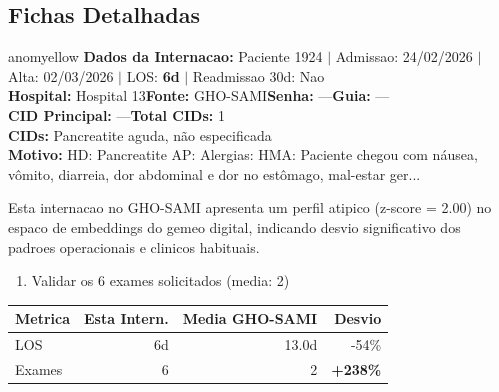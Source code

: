 \documentclass[a4paper,10pt]{article}
\begin{document}
\subsection{Fichas Detalhadas}
\begin{anomalycard}[Internacao 2075 | GHO-SAMI | MODERADO (z=2.00)]{anomyellow}
\textbf{Dados da Internacao:} Paciente 1924 $\mid$ Admissao: 24/02/2026 $\mid$ Alta: 02/03/2026 $\mid$ LOS: \textbf{6d} $\mid$ Readmissao 30d: Nao\\
\textbf{Hospital:} Hospital 13\quad\textbf{Fonte:} GHO-SAMI\quad\textbf{Senha:} ---\quad\textbf{Guia:} ---\\
\textbf{CID Principal:} {\small ---}\quad\textbf{Total CIDs:} 1\\

\textbf{CIDs:} {\scriptsize Pancreatite aguda, não especificada}\\

\textbf{Motivo:} {\scriptsize HD: Pancreatite AP: Alergias: HMA: Paciente chegou com náusea, vômito, diarreia, dor abdominal e dor no estômago, mal-estar ger...}\\

\vspace{2pt}\begin{tcolorbox}[colback=severityred!20,colframe=anomyellow,title={\textbf{Interpretacao de Negocio}},fonttitle=\bfseries\small,left=4pt,right=4pt,top=3pt,bottom=3pt]
{\small Esta internacao no GHO-SAMI apresenta um perfil atipico (z-score = 2.00) no espaco de embeddings do gemeo digital, indicando desvio significativo dos padroes operacionais e clinicos habituais.}
\end{tcolorbox}
\begin{tcolorbox}[colback=severityyellow!30,colframe=anomorange,title={\textbf{Recomendacoes Especificas}},fonttitle=\bfseries\small,left=4pt,right=4pt,top=3pt,bottom=3pt]
\begin{enumerate}[nosep,leftmargin=16pt]
\item {\small Validar os 6 exames solicitados (media: 2)}
\end{enumerate}
\end{tcolorbox}
\begin{center}\begin{tabular}{l r r r}\toprule\textbf{Metrica} & \textbf{Esta Intern.} & \textbf{Media GHO-SAMI} & \textbf{Desvio} \\\midrule
LOS & 6d & 13.0d & -54\% \\
Exames & 6 & 2 & \textcolor{anomred}{\textbf{+238\%}} \\
\bottomrule\end{tabular}\end{center}


\end{anomalycard}
\end{document}
